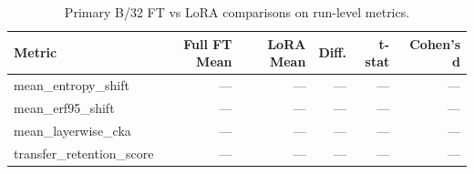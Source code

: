 \begin{table}[t]
\centering
\caption{Primary B/32 FT vs LoRA comparisons on run-level metrics.}
\label{tab:stats}
\small
\begin{tabular}{lrrrrr}
\toprule
Metric & Full FT Mean & LoRA Mean & Diff. & t-stat & Cohen's d \\
\midrule
mean_entropy_shift & --- & --- & --- & --- & --- \\
mean_erf95_shift & --- & --- & --- & --- & --- \\
mean_layerwise_cka & --- & --- & --- & --- & --- \\
transfer_retention_score & --- & --- & --- & --- & --- \\
\bottomrule
\end{tabular}
\end{table}
